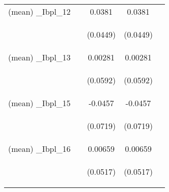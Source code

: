\documentclass[]{article}
\begin{document}
\begin{center}
\begin{tabular}{lcccc}
(mean) \_Ibpl\_12 &  & 0.0381 & 0.0381 &  \\
\vspace{4pt} & \begin{footnotesize}\end{footnotesize} & \begin{footnotesize}(0.0449)\end{footnotesize} & \begin{footnotesize}(0.0449)\end{footnotesize} & \begin{footnotesize}\end{footnotesize} \\
(mean) \_Ibpl\_13 &  & 0.00281 & 0.00281 &  \\
\vspace{4pt} & \begin{footnotesize}\end{footnotesize} & \begin{footnotesize}(0.0592)\end{footnotesize} & \begin{footnotesize}(0.0592)\end{footnotesize} & \begin{footnotesize}\end{footnotesize} \\
(mean) \_Ibpl\_15 &  & -0.0457 & -0.0457 &  \\
\vspace{4pt} & \begin{footnotesize}\end{footnotesize} & \begin{footnotesize}(0.0719)\end{footnotesize} & \begin{footnotesize}(0.0719)\end{footnotesize} & \begin{footnotesize}\end{footnotesize} \\
(mean) \_Ibpl\_16 &  & 0.00659 & 0.00659 &  \\
\vspace{4pt} & \begin{footnotesize}\end{footnotesize} & \begin{footnotesize}(0.0517)\end{footnotesize} & \begin{footnotesize}(0.0517)\end{footnotesize} & \begin{footnotesize}\end{footnotesize} \\

\end{tabular}
\end{center}
\end{document}
